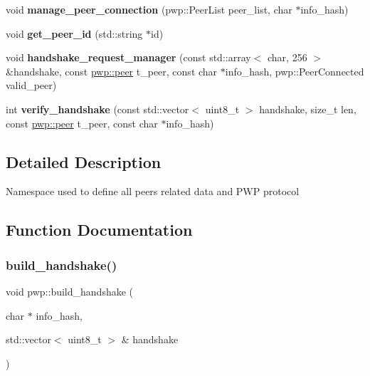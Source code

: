 \begin{DoxyCompactItemize}
\item 
\mbox{\label{namespacepwp_ab82c0d015f6ba23e766c4b942a125b5f}} 
void {\bfseries manage\+\_\+peer\+\_\+connection} (pwp\+::\+Peer\+List peer\+\_\+list, char $\ast$info\+\_\+hash)
\item 
\mbox{\label{namespacepwp_a5f03cde749af88a393c999545830b192}} 
void {\bfseries get\+\_\+peer\+\_\+id} (std\+::string $\ast$id)
\item 
\mbox{\label{namespacepwp_ae2eeca61e271fabff5fa45308396009e}} 
void {\bfseries handshake\+\_\+request\+\_\+manager} (const std\+::array$<$ char, 256 $>$ \&handshake, const \hyperlink{structpwp_1_1peer}{pwp\+::peer} t\+\_\+peer, const char $\ast$info\+\_\+hash, pwp\+::\+Peer\+Connected valid\+\_\+peer)
\item 
\mbox{\label{namespacepwp_aed118903b8345e62507ade49c6032d32}} 
int {\bfseries verify\+\_\+handshake} (const std\+::vector$<$ uint8\+\_\+t $>$ handshake, size\+\_\+t len, const \hyperlink{structpwp_1_1peer}{pwp\+::peer} t\+\_\+peer, const char $\ast$info\+\_\+hash)
\end{DoxyCompactItemize}


\subsection{Detailed Description}
Namespace used to define all peer\textquotesingle{}s related data and P\+WP protocol 

\subsection{Function Documentation}
\mbox{\label{namespacepwp_a6062876f4d4d4d6ee19341a79a797864}} 
\subsubsection{\texorpdfstring{build\+\_\+handshake()}{build\_handshake()}}
{\footnotesize\ttfamily void pwp\+::build\+\_\+handshake (\begin{DoxyParamCaption}\item[{char $\ast$}]{info\+\_\+hash,  }\item[{std\+::vector$<$ uint8\+\_\+t $>$ \&}]{handshake }\end{DoxyParamCaption})}

